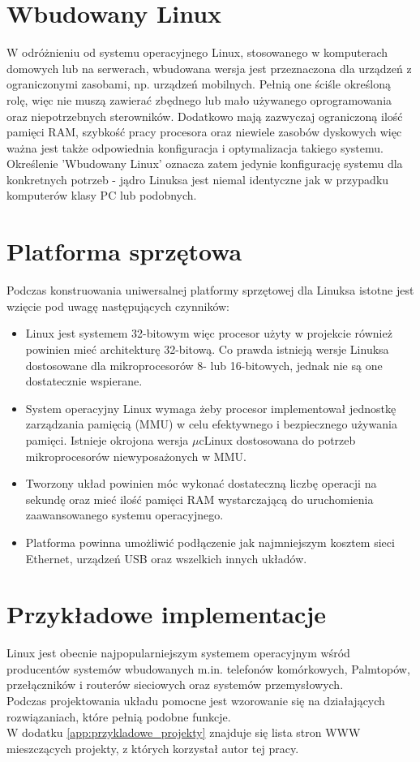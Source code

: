 \documentclass[a4paper,12pt]{book}
\begin{document}
		\section{Wbudowany Linux}
			W odróżnieniu od systemu operacyjnego Linux, stosowanego w komputerach domowych lub na serwerach, wbudowana wersja jest przeznaczona dla urządzeń z ograniczonymi zasobami, np. urządzeń mobilnych. Pełnią one ściśle określoną rolę, więc nie muszą zawierać zbędnego lub mało używanego oprogramowania oraz niepotrzebnych sterowników. Dodatkowo mają zazwyczaj ograniczoną ilość pamięci RAM, szybkość pracy procesora oraz niewiele zasobów dyskowych więc ważna jest także odpowiednia konfiguracja i optymalizacja takiego systemu.\\
			Określenie 'Wbudowany Linux' oznacza zatem jedynie konfigurację systemu dla konkretnych potrzeb - jądro Linuksa jest niemal identyczne jak w przypadku komputerów klasy PC lub podobnych.
		\section{Platforma sprzętowa}
			Podczas konstruowania uniwersalnej platformy sprzętowej dla Linuksa istotne jest wzięcie pod uwagę następujących czynników:
			\begin{itemize}
				\item Linux jest systemem 32-bitowym więc procesor użyty w projekcie również powinien mieć architekturę 32-bitową. Co prawda istnieją wersje Linuksa dostosowane dla mikroprocesorów 8- lub 16-bitowych, jednak nie są one dostatecznie wspierane.
				\item System operacyjny Linux wymaga żeby procesor implementował jednostkę zarządzania pamięcią (MMU) w celu efektywnego i bezpiecznego używania pamięci. Istnieje okrojona wersja $\mu$cLinux\cite{website:uclinux} dostosowana do potrzeb mikroprocesorów niewyposażonych w MMU.
				\item Tworzony układ powinien móc wykonać dostateczną liczbę operacji na sekundę oraz mieć ilość pamięci RAM wystarczającą do uruchomienia zaawansowanego systemu operacyjnego.
				\item Platforma powinna umożliwić podłączenie jak najmniejszym kosztem sieci Ethernet, urządzeń USB oraz wszelkich innych układów.
			\end{itemize}
		\section{Przykładowe implementacje}
			Linux jest obecnie najpopularniejszym systemem operacyjnym wśród producentów systemów wbudowanych m.in. telefonów komórkowych, Palmtopów, przełączników i routerów sieciowych oraz systemów przemysłowych.\\
			Podczas projektowania układu pomocne jest wzorowanie się na działających rozwiązaniach, które pełnią podobne funkcje.\\
			W dodatku \ref{app:przykladowe_projekty} znajduje się lista stron WWW mieszczących projekty, z których korzystał autor tej pracy.
\end{document}
